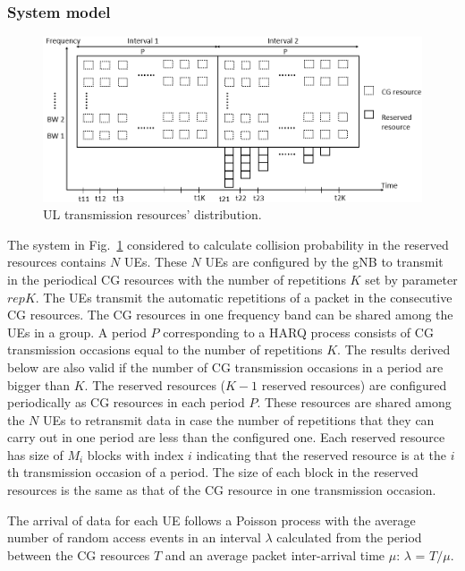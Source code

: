 \documentclass{ieeeaccess}
\begin{document}
\subsubsection{System model} \label{IIIB2}

\begin{figure}[htbp]
\centerline{\includegraphics[scale=0.33]{fig6.PNG}}
\caption{UL transmission resources' distribution.}
\label{fig6}
\vspace{-2mm}
\end{figure}

The system in Fig.~\ref{fig6} considered to calculate collision probability in the reserved resources contains $N$ UEs. These $N$ UEs are configured by the gNB to transmit in the periodical CG resources with the number of repetitions $K$ set by parameter $repK$. The UEs transmit the automatic repetitions of a packet in the consecutive CG resources. The CG resources in one frequency band can be shared among the UEs in a group. A period $P$ corresponding to a HARQ process consists of CG transmission occasions equal to the number of repetitions $K$. The results derived below are also valid if the number of CG transmission occasions in a period are bigger than $K$. The reserved resources ($K-1$ reserved resources) are configured periodically as CG resources in each period $P$. These resources are shared among the $N$ UEs to retransmit data in case the number of repetitions that they can carry out in one period are less than the configured one. Each reserved resource has size of $M_{i}$ blocks with index $i$ indicating that the reserved resource is at the $i$th transmission occasion of a period. The size of each block in the reserved resources is the same as that of the CG resource in one transmission occasion.

The arrival of data for each UE follows a Poisson process with the average number of random access events in an interval $\lambda$ calculated from the period between the CG resources $T$ and an average packet inter-arrival time $\mu$: $\lambda$ = $T/\mu$.
\end{document}
